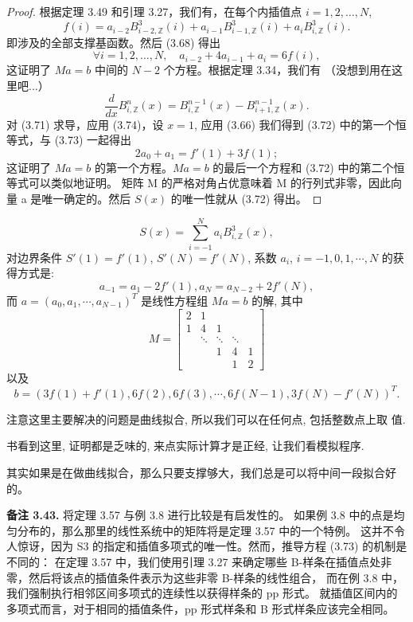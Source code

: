 \documentclass[a4paper]{ctexart}
\begin{document}
{\begin{proof}
根据定理 3.49 和引理 3.27，我们有，在每个内插值点 $i = 1, 2, \ldots, N$,
$$ 
f(i) = a_{i-2} B_{i-2, \mathbb{Z}}^3(i) + a_{i-1} B_{i-1, \mathbb{Z}}^3(i) + a_i B_{i, \mathbb{Z}}^3(i). 
$$
即涉及的全部支撑基函数。然后 (3.68) 得出
\[ 
\forall i = 1, 2, \ldots, N, \quad a_{i-2} + 4a_{i-1} + a_i = 6f(i), \tag{3.73}
\]
这证明了 $Ma = b$ 中间的 $N-2$ 个方程。根据定理 3.34，我们有 （没想到用在这里吧...）
\[ 
\frac{d}{dx} B_{i, \mathbb{Z}}^n(x) = B_{i, \mathbb{Z}}^{n-1}(x) - B_{i+1, \mathbb{Z}}^{n-1}(x). \tag{3.74}
\]
对 (3.71) 求导，应用 (3.74)，设 $x = 1$, 应用 (3.66) 我们得到 (3.72) 中的第一个恒等式，与 (3.73) 一起得出
$$ 2a_0 + a_1 = f'(1) + 3f(1); $$
这证明了 $Ma = b$ 的第一个方程。$Ma = b$ 的最后一个方程和 (3.72) 中的第二个恒等式可以类似地证明。
矩阵 M 的严格对角占优意味着 M 的行列式非零，因此向量 a 是唯一确定的。然后 $S(x)$ 的唯一性就从 (3.72) 得出。
\end{proof} 


$$
S(x) = \sum_{i = -1}^N a_i B_{i, \mathbb{Z}}^3(x),
$$
对边界条件 $S'(1) = f'(1)$, $S'(N) = f'(N)$,
系数 $a_i$, $i = -1, 0, 1, \cdots, N$ 的获得方式是:
$$
a_{-1} = a_1 - 2 f'(1), a_N = a_{N - 2} + 2 f'(N),
$$
而 $a = (a_0, a_1, \cdots, a_{N - 1})^T$ 是线性方程组 $M a = b$ 的解, 其中
$$
M = \left[
  \begin{array}{ccccc}
    2 & 1 &&& \\
    1 & 4 & 1 &&\\
    & \ddots & \ddots & \ddots & \\
    && 1 & 4 & 1\\
    &&& 1 & 2
  \end{array}
  \right]
$$
以及
$$
b = \left(3 f(1) + f'(1), 6 f(2), 6 f (3), \cdots, 6 f(N - 1), 3
f(N) - f'(N) \right)^T.
$$

注意这里主要解决的问题是曲线拟合, 所以我们可以在任何点, 包括整数点上取
值.

书看到这里, 证明都是乏味的, 来点实际计算才是正经, 让我们看模拟程序.

其实如果是在做曲线拟合，那么只要支撑够大，我们总是可以将中间一段拟合好的。

\noindent \textbf{备注 3.43.} 将定理 3.57 与例 3.8 进行比较是有启发性的。
如果例 3.8 中的点是均匀分布的，那么那里的线性系统中的矩阵将是定理 3.57 中的一个特例。
这并不令人惊讶，因为 S3 的指定和插值多项式的唯一性。然而，推导方程 (3.73) 的机制是不同的：
在定理 3.57 中，我们使用引理 3.27 来确定哪些 B-样条在插值点处非零，然后将该点的插值条件表示为这些非零 B-样条的线性组合，
而在例 3.8 中，我们强制执行相邻区间多项式的连续性以获得样条的 pp 形式。
就插值区间内的多项式而言，对于相同的插值条件，pp 形式样条和 B 形式样条应该完全相同。

}
\end{document}

